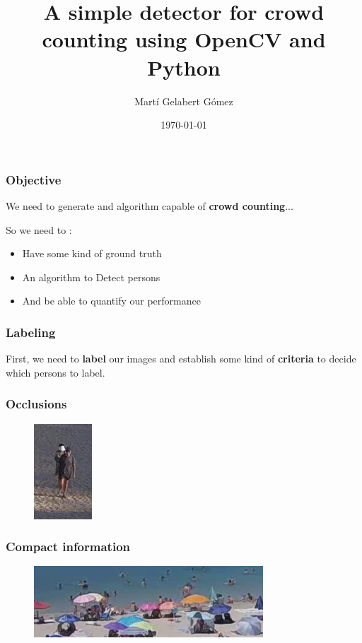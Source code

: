 \documentclass{beamer}
\title{A simple detector for crowd counting using OpenCV and Python}
\author{Martí Gelabert Gómez}
\institute{University of the Balearic Islands}
\date{\today}
\begin{document}
\frame{\titlepage}

\begin{frame}

    \frametitle{Objective}
    We need to generate and algorithm capable of \textbf{crowd counting}...\medskip\pause
    
    So we need  to :
    \begin{itemize}
        
        \item<2-> Have some kind of ground truth
        \item<3-> An algorithm to Detect persons
        \item<4-> And be able to quantify our performance
    \end{itemize}

\end{frame}


\begin{frame}
    \frametitle{Labeling}
    First, we need to \textbf{label} our images and establish some kind of \textbf{criteria} to decide which persons to label. 
\end{frame}

\begin{frame}
    \frametitle{Occlusions}
\begin{figure}
    \centering
    \includegraphics{lab/oclusion.png}
\end{figure}
\end{frame}

\begin{frame}
    \frametitle{Compact information}
\begin{figure}
    \centering
    \includegraphics{lab/shore.png}
\end{figure}
\end{frame}
\end{document}
